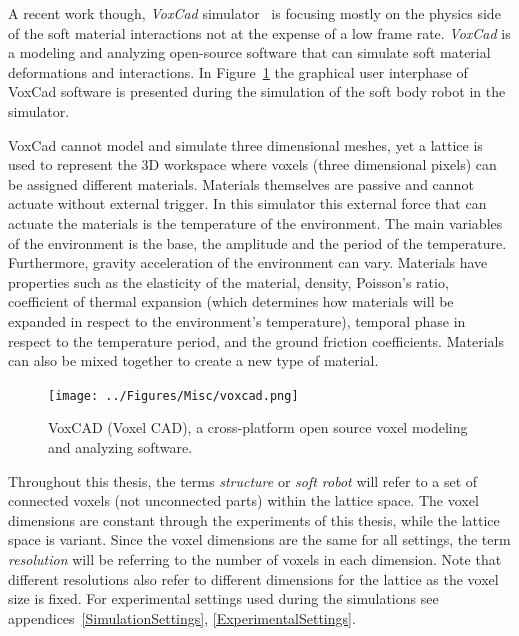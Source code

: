 A recent work though, \emph{VoxCad} simulator~\citep{hiller2012dynamic} is focusing mostly on the physics side of the soft material interactions not at the expense of a low frame rate. \emph{VoxCad} is a modeling and analyzing open-source software that can simulate soft material deformations and interactions. In Figure~\ref{fig:VoxCAD} the graphical user interphase of VoxCad software is presented during the simulation of the soft body robot in the simulator.

VoxCad cannot model and simulate three dimensional meshes, yet a lattice is used to represent the 3D workspace where voxels (three dimensional pixels) can be assigned different materials. Materials themselves are passive and cannot actuate without external trigger. In this simulator this external force that can actuate the materials is the temperature of the environment. The main variables of the environment is the base, the amplitude and the period of the temperature. Furthermore, gravity acceleration of the environment can vary. Materials have properties such as the elasticity of the material, density, Poisson's ratio, coefficient of thermal expansion (which determines how materials will be expanded in respect to the environment's temperature), temporal phase in respect to the temperature period, and the ground friction coefficients. Materials can also be mixed together to create a new type of material.

\begin{figure}[t!]
\centering
\texttt{[image: ../Figures/Misc/voxcad.png]}
\caption{VoxCAD (Voxel CAD), a cross-platform open source voxel modeling and analyzing software.}
\label{fig:VoxCAD}
\end{figure}

Throughout this thesis, the terms \textit{structure} or \textit{soft robot} will refer to a set of connected voxels (not unconnected parts) within the lattice space. The voxel dimensions are constant through the experiments of this thesis, while the lattice space is variant. Since the voxel dimensions are the same for all settings, the term \textit{resolution} will be referring to the number of voxels in each dimension. Note that different resolutions also refer to different dimensions for the lattice as the voxel size is fixed.  For experimental settings used during the simulations see appendices~\ref{SimulationSettings}, \ref{ExperimentalSettings}. 

